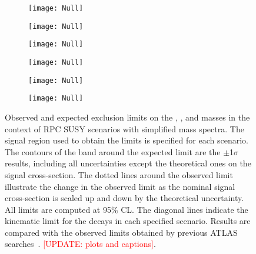 \begin{figure}[p]
\centering
\begin{subfigure}[t]{0.49\textwidth}\texttt{[image: Null]}\caption{}\label{fig:limits_feynman_gtt}\end{subfigure}
\begin{subfigure}[t]{0.49\textwidth}\texttt{[image: Null]}\caption{}\label{fig:limits_feynman_gttOffshell}\end{subfigure}
\begin{subfigure}[t]{0.49\textwidth}\texttt{[image: Null]}\caption{}\label{fig:limits_feynman_gg2WZ}\end{subfigure}
\begin{subfigure}[t]{0.49\textwidth}\texttt{[image: Null]}\caption{}\label{fig:limits_feynman_gg2sl}\end{subfigure}
\begin{subfigure}[t]{0.49\textwidth}\texttt{[image: Null]}\caption{}\label{fig:limits_feynman_b1b1}\end{subfigure}
\begin{subfigure}[t]{0.49\textwidth}\texttt{[image: Null]}\caption{}\label{fig:limits_feynman_t1t1}\end{subfigure}
\caption{
Observed and expected exclusion limits on the \gluino, \sbottomone, \stopone and \ninoone masses 
in the context of RPC SUSY scenarios with simplified mass spectra. The signal region used to obtain the limits is specified for each scenario. 
The contours of the band around the expected limit are the $\pm$1$\sigma$ results, 
including all uncertainties except the theoretical ones on the signal cross-section. The dotted lines around the observed
limit illustrate the change in the observed limit as the nominal signal cross-section is scaled up and down
by the theoretical uncertainty. All limits are computed at 95\% CL. 
The diagonal lines indicate the kinematic limit for the decays in each specified scenario.  
Results are compared with the observed limits obtained by previous ATLAS searches~\cite{paperSS3L,Aad:2016jxj,Aad:2016eki,Aad:2015iea}. 
\textcolor{red}{[UPDATE: plots and captions]}.
}
\label{fig:Results_Limits_RPC} 
\end{figure} 

